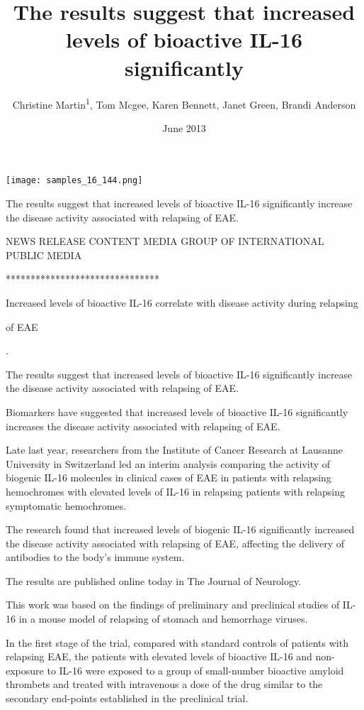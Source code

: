 \documentclass{article}
\title{The results suggest that increased levels of bioactive IL-16 significantly}
\author{Christine Martin\textsuperscript{1},  Tom Mcgee,  Karen Bennett,  Janet Green,  Brandi Anderson}
\affil{\textsuperscript{1}Institute for High Energy Physics}
\date{June 2013}
\begin{document}
\maketitle

\begin{center}
\begin{minipage}{0.75\linewidth}
\texttt{[image: samples\_16\_144.png]}
\end{minipage}
\end{center}

The results suggest that increased levels of bioactive IL-16 significantly increase the disease activity associated with relapsing of EAE.

NEWS RELEASE CONTENT MEDIA GROUP OF INTERNATIONAL PUBLIC MEDIA

*******************************

Increased levels of bioactive IL-16 correlate with disease activity during relapsing

of EAE

.

The results suggest that increased levels of bioactive IL-16 significantly increase the disease activity associated with relapsing of EAE.

Biomarkers have suggested that increased levels of bioactive IL-16 significantly increases the disease activity associated with relapsing of EAE.

Late last year, researchers from the Institute of Cancer Research at Lausanne University in Switzerland led an interim analysis comparing the activity of biogenic IL-16 molecules in clinical cases of EAE in patients with relapsing hemochromes with elevated levels of IL-16 in relapsing patients with relapsing symptomatic hemochromes.

The research found that increased levels of biogenic IL-16 significantly increased the disease activity associated with relapsing of EAE, affecting the delivery of antibodies to the body’s immune system.

The results are published online today in The Journal of Neurology.

This work was based on the findings of preliminary and preclinical studies of IL-16 in a mouse model of relapsing of stomach and hemorrhage viruses.

In the first stage of the trial, compared with standard controls of patients with relapsing EAE, the patients with elevated levels of bioactive IL-16 and non-exposure to IL-16 were exposed to a group of small-number bioactive amyloid thrombets and treated with intravenous a dose of the drug similar to the secondary end-points established in the preclinical trial.
\end{document}
